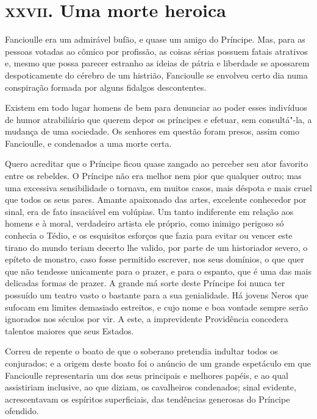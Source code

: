 \chapter{\textsc{xxvii.} Uma morte heroica}

Fancioulle era um admirável bufão, e quase um amigo do Príncipe. Mas,
para as pessoas votadas ao cômico por profissão, as coisas sérias possuem
fatais atrativos e, mesmo que possa parecer estranho as ideias de
pátria e liberdade se apossarem despoticamente do cérebro de um
histrião, Fancioulle se envolveu certo dia numa conspiração formada por alguns
fidalgos descontentes.

Existem em todo lugar homens de bem para denunciar ao poder esses
indivíduos de humor atrabiliário que querem depor os príncipes e
efetuar, sem consultá"-la, a mudança de uma sociedade. Os senhores em
questão foram presos, assim como Fancioulle, e condenados a uma morte
certa.

Quero acreditar que o Príncipe ficou quase zangado ao
perceber seu ator favorito entre os rebeldes. O Príncipe não era
melhor nem pior que qualquer outro; mas uma excessiva sensibilidade o tornava,
em muitos casos, mais déspota e mais cruel que todos os seus pares.
Amante apaixonado das artes, excelente conhecedor por sinal, era de fato
insaciável em volúpias. Um tanto indiferente em relação aos homens e à
moral, verdadeiro artista ele próprio, como inimigo perigoso só conhecia
o Tédio, e os esquisitos esforços que fazia para evitar ou
vencer este tirano do mundo teriam decerto lhe valido, por parte de
um historiador severo, o epíteto de
monstro, caso fosse permitido escrever, nos seus
domínios, o que quer que não tendesse unicamente
para o prazer, e para o espanto, que é uma das mais delicadas formas de
prazer. A grande má sorte deste Príncipe foi nunca ter possuído
um teatro vasto o bastante para a sua genialidade. Há jovens Neros que
sufocam em limites demasiado estreitos, e cujo nome e boa vontade sempre serão ignorados nos séculos por vir. A este, a imprevidente
Providência concedera talentos maiores que seus Estados.

Correu de repente o boato de que o soberano pretendia indultar todos os
conjurados; e a origem deste boato foi o anúncio de um grande
espetáculo em que Fancioulle representaria um dos seus principais e
melhores papéis, e ao qual assistiriam inclusive, ao que diziam, os
cavalheiros condenados; sinal evidente, acrescentavam os espíritos
superficiais, das tendências generosas do Príncipe ofendido.

